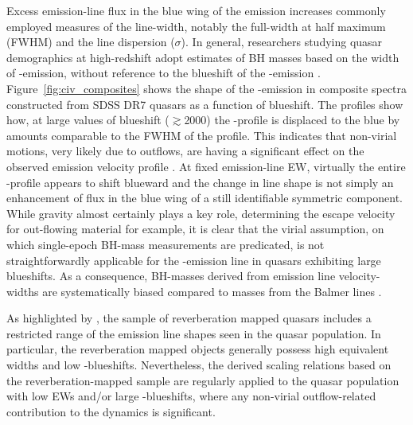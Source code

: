 Excess emission-line flux in the blue wing of the  emission increases commonly employed measures of the line-width, notably the full-width at half maximum (FWHM) and the line dispersion ($\sigma$). 
In general, researchers studying quasar demographics at high-redshift adopt estimates of BH masses based on the width of -emission, without reference to the blueshift of the -emission \citep[e.g.][]{vestergaard04,kollmeier06,gavignaud08,vestergaard08,vestergaard09,kelly10,kelly13}. 
Figure~\ref{fig:civ_composites} shows the shape of the -emission in composite spectra constructed from SDSS DR7 quasars as a function of  blueshift. 
The profiles show how, at large values of blueshift ($\gtrsim$2000\kms) the -profile is displaced to the blue by amounts comparable to the FWHM of the profile.
This indicates that non-virial motions, very likely due to outflows, are having a significant effect on the observed  emission velocity profile \citep[e.g.][]{gaskell82,baskin05,sulentic07,richards11,wang13}. 
At fixed emission-line EW, virtually the entire -profile appears to shift blueward and the change in line shape is not simply an enhancement of flux in the blue wing of a still identifiable symmetric component. 
While gravity almost certainly plays a key role, determining the escape velocity for out-flowing material for example, it is clear that the virial assumption, on which single-epoch BH-mass measurements are predicated, is not straightforwardly applicable for the -emission line in quasars exhibiting large blueshifts. 
As a consequence, BH-masses derived from  emission line velocity-widths are systematically biased compared to masses from the Balmer lines \citep[e.g.][]{shen08,shen12,coatman16}. 

As highlighted by \citet{richards11}, the sample of reverberation mapped quasars includes a restricted range of the  emission line shapes seen in the quasar population. 
In particular, the reverberation mapped objects generally possess high  equivalent widths and low -blueshifts. 
Nevertheless, the derived scaling relations based on the reverberation-mapped sample are regularly applied to the quasar population with low  EWs and/or large -blueshifts, where any non-virial outflow-related contribution to the dynamics is significant. 

